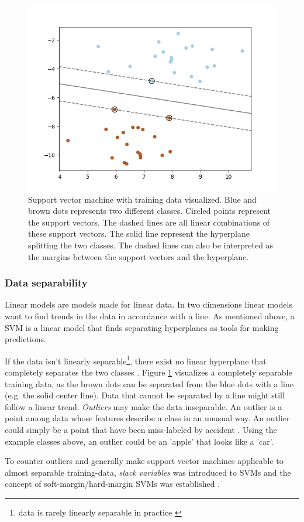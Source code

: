 \documentclass[a4paper,twoside]{bth}
\begin{document}
\begin{figure}
\centering
\includegraphics[scale=0.7]{images/intro-images/SVM_example.png}
   \caption{Support vector machine with training data visualized. 
   Blue and brown dots represents two different classes. 
   Circled points represent the support vectors. The dashed lines are all linear combinations of these support vectors. 
   The solid line represent the hyperplane splitting the two classes. The dashed lines can also be interpreted as the margins between the support vectors and the hyperplane.}
   \label{fig:svm_example}
\end{figure}

\subsubsection{Data separability}
Linear models are models made for linear data. In two dimensions linear models want to find trends in the data in accordance with a line. As mentioned above, a SVM is a linear model that finds separating hyperplanes as tools for making predictions. 
\par If the data isn't linearly separable\footnote{data is rarely linearly separable in practice \cite{Flach:2012:MLA:2490546}}, there exist no linear hyperplane that completely separates the two classes \cite{Flach:2012:MLA:2490546}. Figure \ref{fig:svm_example} visualizes a completely separable training data, as the brown dots can be separated from the blue dots with a line (e.g. the solid center line). Data that cannot be separated by a line might still follow a linear trend. \textit{Outliers} may make the data inseparable. An outlier is a point among data whose features describe a class in an unusual way. An outlier could simply be a point that have been miss-labeled by accident \cite{Flach:2012:MLA:2490546}. Using the example classes above, an outlier could be an 'apple' that looks like a 'car'.
\par To counter outliers and generally make support vector machines applicable to almost separable training-data, \textit{slack variables} was introduced to SVMs and the concept of soft-margin/hard-margin SVMs was established \cite{Cortes:1995:SN:218919.218929}.
\end{document}
